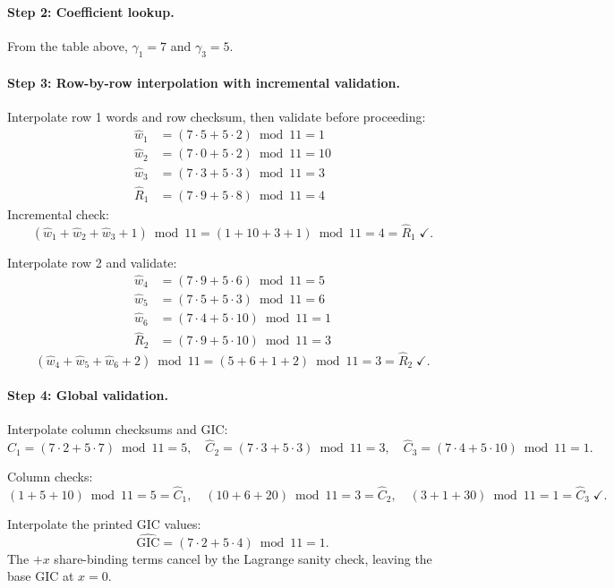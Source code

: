 \documentclass[11pt]{article}
\begin{document}
\paragraph{Step 2: Coefficient lookup.} From the table above, $\gamma_1 = 7$ and $\gamma_3 = 5$.

\paragraph{Step 3: Row-by-row interpolation with incremental validation.}

Interpolate row 1 words and row checksum, then validate before proceeding:
\begin{align*}
\hat{w}_1 &= (7 \cdot 5 + 5 \cdot 2) \bmod 11 = 1 \\
\hat{w}_2 &= (7 \cdot 0 + 5 \cdot 2) \bmod 11 = 10 \\
\hat{w}_3 &= (7 \cdot 3 + 5 \cdot 3) \bmod 11 = 3 \\
\hat{R}_1 &= (7 \cdot 9 + 5 \cdot 8) \bmod 11 = 4
\end{align*}
Incremental check:
\[
(\hat{w}_1+\hat{w}_2+\hat{w}_3+1) \bmod 11
=(1+10+3+1) \bmod 11 = 4 = \hat{R}_1 \;\checkmark.
\]

Interpolate row 2 and validate:
\begin{align*}
\hat{w}_4 &= (7 \cdot 9 + 5 \cdot 6) \bmod 11 = 5 \\
\hat{w}_5 &= (7 \cdot 5 + 5 \cdot 3) \bmod 11 = 6 \\
\hat{w}_6 &= (7 \cdot 4 + 5 \cdot 10) \bmod 11 = 1 \\
\hat{R}_2 &= (7 \cdot 9 + 5 \cdot 10) \bmod 11 = 3
\end{align*}
\[
(\hat{w}_4+\hat{w}_5+\hat{w}_6+2) \bmod 11
=(5+6+1+2) \bmod 11 = 3 = \hat{R}_2 \;\checkmark.
\]

\paragraph{Step 4: Global validation.}

Interpolate column checksums and GIC:
\[
\hat{C}_1 = (7 \cdot 2 + 5 \cdot 7) \bmod 11 = 5,\quad
\hat{C}_2 = (7 \cdot 3 + 5 \cdot 3) \bmod 11 = 3,\quad
\hat{C}_3 = (7 \cdot 4 + 5 \cdot 10) \bmod 11 = 1.
\]

Column checks:
\[
(1+5+10) \bmod 11 = 5 = \hat{C}_1,\quad
(10+6+20) \bmod 11 = 3 = \hat{C}_2,\quad
(3+1+30) \bmod 11 = 1 = \hat{C}_3 \;\checkmark.
\]

Interpolate the printed GIC values:
\[
\hat{\text{GIC}} = (7 \cdot 2 + 5 \cdot 4) \bmod 11 = 1.
\]
The $+x$ share-binding terms cancel by the Lagrange sanity check, leaving the base GIC at $x=0$.
\end{document}
